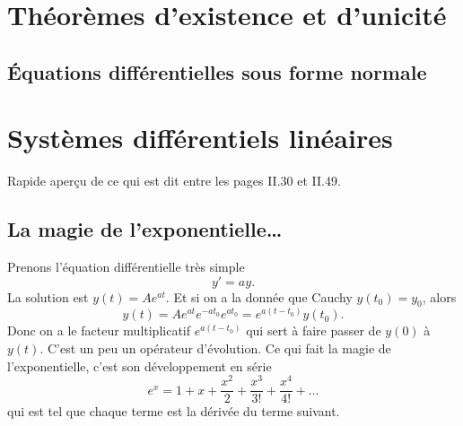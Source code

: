 					\section{Théorèmes d'existence et d'unicité}

					\subsection{Équations différentielles sous forme normale}

					\section{Systèmes différentiels linéaires}

Rapide aperçu de ce qui est dit entre les pages II.30 et II.49.

					\subsection{La magie de l'exponentielle\ldots}

Prenons l'équation différentielle très simple
\begin{equation}
	y'=ay.
\end{equation}
La solution est $y(t)=A e^{at}$. Et si on a la donnée que Cauchy $y(t_0)=y_0$, alors
\begin{equation}		\label{EqytexposimpleProp}
	y(t)=A e^{at} e^{-at_0} e^{at_0}= e^{a(t-t_0)}y(t_0).
\end{equation}
Donc on a le facteur multiplicatif $ e^{a(t-t_0)}$ qui sert à faire passer de $y(0)$ à $y(t)$. C'est un peu un opérateur d'évolution. Ce qui fait la magie  de l'exponentielle, c'est son développement en série
\begin{equation}		\label{EqDevExpoMag}
	e^x=1+x+\frac{ x^2 }{ 2 }+\frac{ x^3 }{ 3! }+\frac{ x^4 }{ 4! }+\ldots
\end{equation}
qui est tel que chaque terme est la dérivée du terme suivant.

